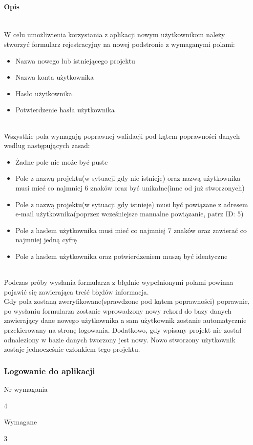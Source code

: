 \documentclass[eng,printmode]{mgr}
\begin{document}
\paragraph{Opis}\ \\
W celu umożliwienia korzystania z aplikacji nowym użytkownikom należy stworzyć formularz rejestracyjny na nowej podstronie z wymaganymi polami:
\begin{itemize}
	\item[--] Nazwa nowego lub istniejącego projektu
	\item[--] Nazwa konta użytkownika
	\item[--] Hasło użytkownika
	\item[--] Potwierdzenie hasła użytkownika
\end{itemize}
\ \\
Wszystkie pola wymagają poprawnej walidacji pod kątem poprawności danych według następujących zasad:
\begin{itemize}
	\item[--] Żadne pole nie może być puste
	\item[--] Pole z nazwą projektu(w sytuacji gdy nie istnieje) oraz nazwą użytkownika musi mieć co najmniej 6 znaków oraz być unikalne(inne od już stworzonych)
	\item[--] Pole z nazwą projektu(w sytuacji gdy istnieje) musi być powiązane z adresem e-mail użytkownika(poprzez wcześniejsze manualne powiązanie, patrz ID: 5)
	\item[--] Pole z hasłem użytkownika musi mieć co najmniej 7 znaków oraz zawierać co najmniej jedną cyfrę
	\item[--] Pole z hasłem użytkownika oraz potwierdzeniem muszą być identyczne
\end{itemize}
\ \\
Podczas próby wysłania formularza z błędnie wypełnionymi polami powinna pojawić się zawierająca treść błędów informacja.
\\
Gdy pola zostaną zweryfikowane(sprawdzone pod kątem poprawności) poprawnie, po wysłaniu formularza zostanie wprowadzony nowy rekord do bazy danych zawierający dane nowego użytkownika a sam użytkownik zostanie automatycznie przekierowany na stronę logowania. Dodatkowo, gdy wpisany projekt nie został odnaleziony w bazie danych tworzony jest nowy. Nowo stworzony użytkownik zostaje jednocześnie członkiem tego projektu.
\newpage

\subsubsection{Logowanie do aplikacji}
\begin{labeling}{Nr wymagania}
\item [Nr wymagania:] 4
\item [Typ:] Wymagane
\item [Powiązania:] 3
\end{labeling}
\end{document}
